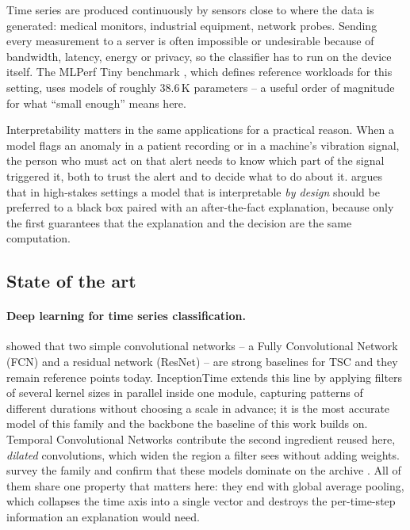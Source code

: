 Time series are produced continuously by sensors close to where the data is generated: medical
monitors, industrial equipment, network probes. Sending every measurement to a server is often
impossible or undesirable because of bandwidth, latency, energy or privacy, so the classifier has to
run on the device itself. The MLPerf Tiny benchmark \citep{banbury2021mlperftiny}, which defines
reference workloads for this setting, uses models of roughly 38.6\,K parameters -- a useful order of
magnitude for what ``small enough'' means here.

Interpretability matters in the same applications for a practical reason. When a model flags an
anomaly in a patient recording or in a machine's vibration signal, the person who must act on that
alert needs to know which part of the signal triggered it, both to trust the alert and to decide
what to do about it. \citet{rudin2019stop} argues that in high-stakes settings a model that is
interpretable \emph{by design} should be preferred to a black box paired with an after-the-fact
explanation, because only the first guarantees that the explanation and the decision are the same
computation.

\subsection{State of the art}
\label{sec:intro:sota}

\paragraph{Deep learning for time series classification.}
\citet{wang2017fcn} showed that two simple convolutional networks -- a Fully Convolutional Network
(FCN) and a residual network (ResNet) -- are strong baselines for TSC and they remain reference
points today. InceptionTime \citep{fawaz2020inceptiontime} extends this line by applying filters of
several kernel sizes in parallel inside one module, capturing patterns of different durations
without choosing a scale in advance; it is the most accurate model of this family and the backbone
the baseline of this work builds on. Temporal Convolutional Networks \citep{bai2018tcn} contribute
the second ingredient reused here, \emph{dilated} convolutions, which widen the region a filter sees
without adding weights. \citet{fawaz2019review} survey the family and confirm that these models
dominate on the \ucr{} archive \citep{dau2019ucr}. All of them share one property that matters here:
they end with global average pooling, which collapses the time axis into a single vector and
destroys the per-time-step information an explanation would need.


